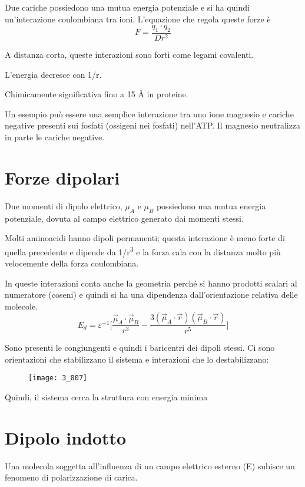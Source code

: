 Due cariche possiedono una mutua energia potenziale e si ha quindi
un'interazione coulombiana tra ioni.
L'equazione che regola queste forze è
\[
  F = \frac{q_1 \cdot q_2}{Dr^2}
\]


A distanza corta, queste interazioni sono forti come legami covalenti.

L'energia decresce con 1/r.

Chimicamente significativa fino a 15 \AA{} in proteine.

Un esempio può essere una semplice interazione tra uno ione magnesio e cariche negative presenti sui fosfati (ossigeni nei fosfati) nell'ATP. Il magnesio neutralizza in parte le cariche negative.

\section{Forze dipolari}

Due momenti di dipolo elettrico, $\mu_A$ e $\mu_B$
possiedono una mutua energia potenziale, dovuta al campo elettrico
generato dai momenti stessi.


Molti aminoacidi hanno dipoli permanenti; questa interazione è meno
forte di quella precedente e dipende da 1/r\textsuperscript{3} e la
forza cala con la distanza molto più velocemente della forza
coulombiana.

In queste interazioni conta anche la geometria perché si hanno prodotti
scalari al numeratore (coseni) e quindi si ha una dipendenza
dall'orientazione relativa delle molecole.
\[
E_d = \varepsilon^{-1} \biggl[\frac{\vec{\mu}_A \cdot \vec{\mu}_B}{r^3} - \frac{3(\vec{\mu}_A \cdot \vec{r})(\vec{\mu}_B \cdot \vec{r})}{r^5} \biggr]
\]

Sono presenti le congiungenti e quindi i baricentri dei dipoli stessi. Ci sono orientazioni che stabilizzano il sistema e interazioni che lo
destabilizzano:

\begin{figure}[H]
  \texttt{[image: 3\_007]}
\end{figure}

Quindi, il sistema cerca la struttura con energia minima

\section{Dipolo indotto}

Una molecola soggetta all'influenza di un campo elettrico esterno (E)
subisce un fenomeno di polarizzazione di carica.

